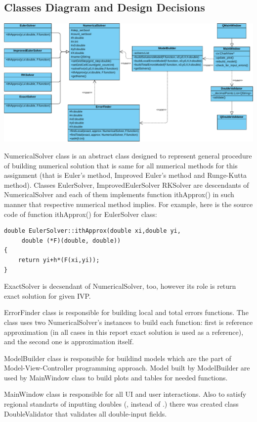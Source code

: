 \documentclass[a4paper,12pt]{article}
\begin{document}
\subsection{Classes Diagram and Design Decisions}
\includegraphics[width=\linewidth]{fin.pdf}

NumericalSolver class is an abstract class designed to represent  
general procedure of building numerical solution that is same for all
numerical methods for this assignment (that is Euler's method, Improved 
Euler's method and Runge-Kutta method). Classes EulerSolver, ImprovedEulerSolver
RKSolver are descendants of NumericalSolver and each of them implements
function ithApprox() in such manner that respective numerical method implies.
For example, here is the source code of function ithApprox() for EulerSolver class:
\begin{lstlisting}
double EulerSolver::ithApprox(double xi,double yi,
     double (*F)(double, double))
{
    return yi+h*(F(xi,yi));
}
\end{lstlisting}
ExactSolver is decsendant of NumericalSolver, too, however its role is return
exact solution for given IVP.

ErrorFinder class is responsible for building local and total errors
functions. The class uses two NumericalSolver's instances to build each
function: first is reference approximation (in all cases in this report exact
solution is used as a reference), and the second one is approximation itself.

ModelBuilder class is responsible for buildind models which are the part of
Model-View-Controller programming approach. Model built by ModelBuilder are used 
by MainWindow class to build plots and tables for needed functions.

MainWindow class is responsible for all UI and user interactions. Also to satisfy
regional standarts of inputting doubles (, instead of .) there was created class 
DoubleValidator that validates all double-input fields.
\end{document}
